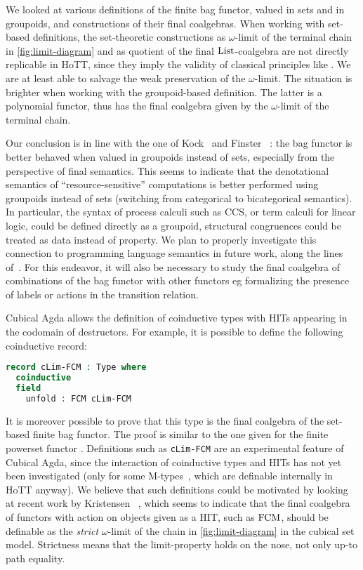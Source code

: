 \documentclass[final,a4paper,USenglish,cleveref]{lipics-v2021}
\begin{document}
We looked at various definitions of the finite bag functor, valued in sets and in groupoids, and constructions of their final coalgebras. When working with set-based definitions, the set-theoretic constructions as $\omega$-limit of the terminal chain in \eqref{fig:limit-diagram} and as quotient of the final $\List$-coalgebra are not directly replicable in HoTT, since they imply the validity of classical principles like \LLPO{}. We are at least able to salvage the weak preservation of the $\omega$-limit. The situation is brighter when working with the groupoid-based definition. The latter is a polynomial functor, thus has the final coalgebra given by the $\omega$-limit of the terminal chain.

Our conclusion is in line with the one of Kock~\cite{Kock2012} and Finster \etal~\cite{Finster2021}: the bag functor is better behaved when valued in groupoids instead of sets, especially from the perspective of final semantics. This seems to indicate that the denotational semantics of ``resource-sensitive'' computations
is better performed using groupoids instead of sets (switching from categorical to bicategorical semantics).
In particular, the syntax of process calculi such as CCS, or term calculi for linear logic,  could be defined directly as a groupoid, \ie structural congruences could be treated as data instead of property. We plan to properly investigate this connection to programming language semantics in future work,
along the lines of~\cite{Choudhury2022}.
For this endeavor, it will also be necessary to study the final coalgebra of combinations of the bag functor with other functors  eg formalizing the presence of labels or actions in the transition relation.

Cubical Agda allows the definition of coinductive types with HITs appearing in the codomain of destructors. For example, it is possible to define the following coinductive record:
\begin{lstlisting}[language={Agda}]
record cLim-FCM : Type where
  coinductive
  field
    unfold : FCM cLim-FCM
\end{lstlisting}
It is moreover possible to prove that this type is the final coalgebra of the set-based finite bag functor. The proof is similar to the one given for the finite powerset functor \cite[Theorem 2]{Veltri2021}. Definitions such as \lstinline{cLim-FCM} are an experimental feature of Cubical Agda, since the interaction of coinductive types and HITs has not yet been investigated (only for some M-types~\cite{Vezzosi2019}, which are definable internally in HoTT anyway). We believe that such definitions could be motivated by looking at recent work by Kristensen \etal~\cite{Kristensen2022}, which seems to indicate that the final coalgebra of functors with action on objects given as a HIT, such as $\FCM$, should be definable as the \emph{strict} $\omega$-limit of the chain in \eqref{fig:limit-diagram} in the cubical set model. Strictness means that the limit-property holds on the nose, not only up-to path equality.


\end{document}

